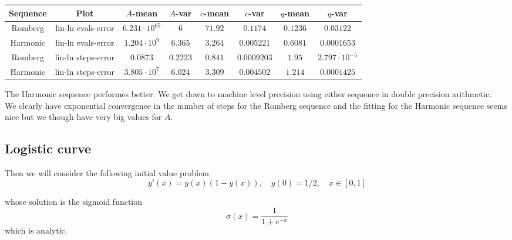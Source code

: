 \begin{table}[H]
    \centering
    \small
    \begin{tabular}{c|c||c|c|c|c|c|c}
Sequence & Plot & \(A\)-mean & \(A\)-var & \(c\)-mean & \(c\)-var & \(q\)-mean & \(q\)-var\\\hline
\rowcolor{red}
Romberg & lin-ln evals-error & \(6.231\cdot 10^{65}\) & \(6\) & \(71.92\) & \(0.1174\) & \(0.1236\) & \(0.03122\) \\
\rowcolor{yellow}
Harmonic & lin-ln evals-error & \(1.204\cdot 10^9\) & \(6.365\) & \(3.264\) & \(0.005221\) & \(0.6081\) & \(0.0001653\) \\
\rowcolor{green}
Romberg & lin-ln steps-error & \(0.0873\) & \(0.2223\) & \(0.841\) & \(0.0009203\) & \(1.95\) & \(2.797\cdot 10^{-5}\) \\
\rowcolor{yellow}
Harmonic & lin-ln steps-error & \(3.805\cdot 10^7\) & \(6.024\) & \(3.309\) & \(0.004502\) & \(1.214\) & \(0.0001425\) \\
    \end{tabular}
    \label{tab:my_label}
\end{table}

The Harmonic sequence performes better. We get down to machine level precision using either sequence in double precision arithmetic.\\

We clearly have exponential convergence in the number of steps for the Romberg sequence and the fitting for the Harmonic sequence seems nice but we though have very big values for \(A\).

\subsection{Logistic curve}

Then we will consider the following initial value problem
\begin{equation}\label{43}
y'(x) = y(x)(1-y(x)),\quad y(0) = 1/2, \quad x\in [0,1]
\end{equation}

whose solution is the sigmoid function
\[
\sigma(x) = \frac{1}{1 + e^{-x}}
\]
which is analytic.

